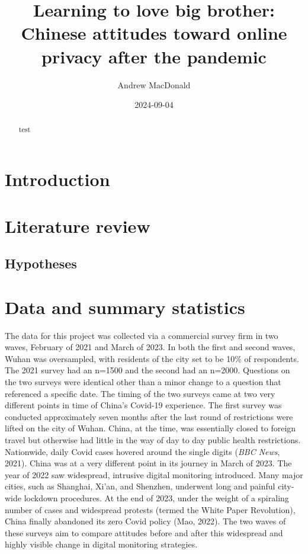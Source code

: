 \documentclass[
  letterpaper,
  DIV=11,
  numbers=noendperiod]{scrartcl}
\title{Learning to love big brother: Chinese attitudes toward online
privacy after the pandemic}
\author{Andrew MacDonald}
\date{2024-09-04}
\begin{document}
\maketitle
\begin{abstract}
test
\end{abstract}

\section{Introduction}\label{sec-introduction}

\section{Literature review}\label{sec-litreview}

\subsection{Hypotheses}\label{hypotheses}

\section{Data and summary statistics}\label{sec-datasummary}

The data for this project was collected via a commercial survey firm in
two waves, February of 2021 and March of 2023. In both the first and
second waves, Wuhan was oversampled, with residents of the city set to
be 10\% of respondents. The 2021 survey had an n=1500 and the second had
an n=2000. Questions on the two surveys were identical other than a
minor change to a question that referenced a specific date. The timing
of the two surveys came at two very different points in time of China's
Covid-19 experience. The first survey was conducted approximately seven
months after the last round of restrictions were lifted on the city of
Wuhan. China, at the time, was essentially closed to foreign travel but
otherwise had little in the way of day to day public health
restrictions. Nationwide, daily Covid cases hovered around the single
digits (\emph{BBC News}, 2021). China was at a very different point in
its journey in March of 2023. The year of 2022 saw widespread, intrusive
digital monitoring introduced. Many major cities, such as Shanghai,
Xi'an, and Shenzhen, underwent long and painful city-wide lockdown
procedures. At the end of 2023, under the weight of a spiraling number
of cases and widespread protests (termed the White Paper Revolution),
China finally abandoned its zero Covid policy (Mao, 2022). The two waves
of these surveys aim to compare attitudes before and after this
widespread and highly visible change in digital monitoring strategies.
\end{document}

